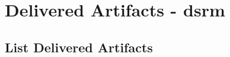 


\newcommand{\appsection}[1]{\noindent \textbf{Appendix: #1}\vspace{1em}}



\chapter{Delivered Artifacts - \acrshort{dsrm}}
\label{chap:artifacts-list}

\section{List Delivered Artifacts}
\label{appex:artifacts-list}





